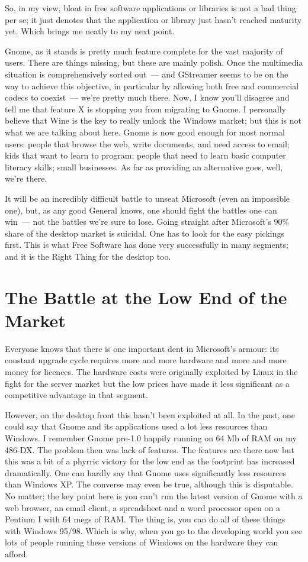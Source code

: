 \documentclass{book}
\begin{document}
So, in my view, bloat in free software applications or libraries is
not a bad thing per se; it just denotes that the application or
library just hasn't reached maturity yet. Which brings me neatly to my
next point.

Gnome, as it stands is pretty much feature complete for the vast
majority of users. There are things missing, but these are mainly
polish. Once the multimedia situation is comprehensively sorted out~---
and GStreamer seems to be on the way to achieve this objective, in
particular by allowing both free and commercial codecs to coexist~---
we're pretty much there. Now, I know you'll disagree and tell me that
feature X is stopping you from migrating to Gnome. I personally
believe that Wine is the key to really unlock the Windows market; but
this is not what we are talking about here. Gnome is now good enough
for most normal users: people that browse the web, write documents,
and need access to email; kids that want to learn to program; people
that need to learn basic computer literacy skills; small
businesses. As far as providing an alternative goes, well, we're
there.

It will be an incredibly difficult battle to unseat Microsoft (even an
impossible one), but, as any good General knows, one should fight the
battles one can win~--- not the battles we're sure to lose. Going
straight after Microsoft's 90\% share of the desktop market is
suicidal. One has to look for the easy pickings first. This is what
Free Software has done very successfully in many segments; and it is
the Right Thing for the desktop too.

\section{The Battle at the Low End of the Market}

Everyone knows that there is one important dent in Microsoft's armour:
its constant upgrade cycle requires more and more hardware and more
and more money for licences. The hardware costs were originally
exploited by Linux in the fight for the server market but the low
prices have made it less significant as a competitive advantage in
that segment.

However, on the desktop front this hasn't been exploited at all. In
the past, one could say that Gnome and its applications used a lot
less resources than Windows. I remember Gnome pre-1.0 happily running
on 64 Mb of RAM on my 486-DX. The problem then was lack of
features. The features are there now but this was a bit of a phyrric
victory for the low end as the footprint has increased
dramatically. One can hardly say that Gnome uses significantly less
resources than Windows XP. The converse may even be true, although
this is disputable. No matter; the key point here is you can't run the
latest version of Gnome with a web browser, an email client, a
spreadsheet and a word processor open on a Pentium I with 64 megs of
RAM. The thing is, you can do all of these things with Windows
95/98. Which is why, when you go to the developing world you see lots
of people running these versions of Windows on the hardware they can
afford.
\end{document}
